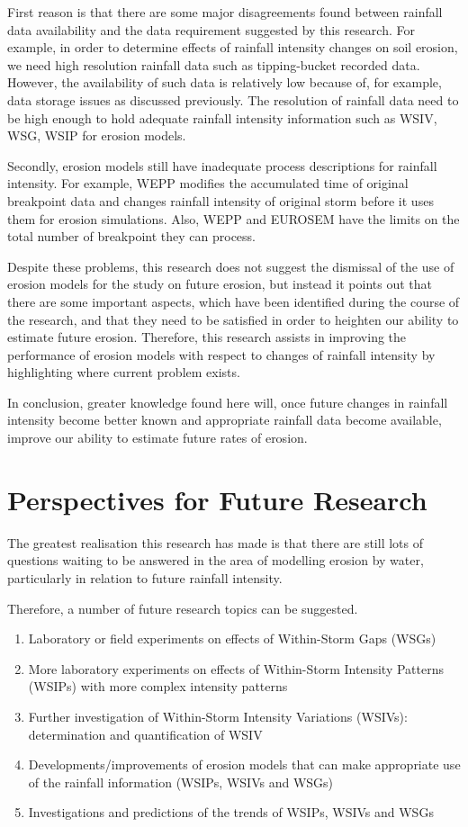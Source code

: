First reason is that there are some major disagreements found between rainfall
data availability and the data requirement suggested by this research. For
example, in order to determine effects of rainfall intensity changes on soil
erosion, we need high resolution rainfall data such as tipping-bucket recorded
data. However, the availability of such data is relatively low because of, for
example, data storage issues as discussed previously. The resolution of rainfall
data need to be high enough to hold adequate rainfall intensity information such
as WSIV, WSG, WSIP for erosion models.

Secondly, erosion models still have inadequate process descriptions for rainfall
intensity. For example, WEPP modifies the accumulated time of original
breakpoint data and changes rainfall intensity of original storm before it uses
them for erosion simulations. Also, WEPP and EUROSEM have the limits on the
total number of breakpoint they can process.

Despite these problems, this research does not suggest the dismissal of the use
of erosion models for the study on future erosion, but instead it points out
that there are some important aspects, which have been identified during the
course of the research, and that they need to be satisfied in order to heighten
our ability to estimate future erosion.
Therefore, this research assists in improving the performance of erosion
models with respect to changes of rainfall intensity by highlighting where
current problem exists.

In conclusion, greater knowledge found here will, once future changes in
rainfall intensity become better known and appropriate rainfall data become
available, improve our ability to estimate future rates of erosion.

\section{Perspectives for Future Research}
\label{sec:SuggestionsForFutureResearch}

The greatest realisation this research has made is that there are still lots of
questions waiting to be answered in the area of modelling erosion by water,
particularly in relation to future rainfall intensity.

Therefore, a number of future research topics can be suggested.
\begin{enumerate}
  \item Laboratory or field experiments on effects of Within-Storm Gaps (WSGs)
  \item More laboratory experiments on effects of Within-Storm Intensity
Patterns (WSIPs) with more complex intensity patterns
  \item Further investigation of Within-Storm Intensity Variations (WSIVs):
determination and quantification of WSIV
  \item Developments/improvements of erosion models that can make appropriate
use of the rainfall information (WSIPs, WSIVs and WSGs)
  \item Investigations and predictions of the trends of WSIPs, WSIVs and WSGs
\end{enumerate}


